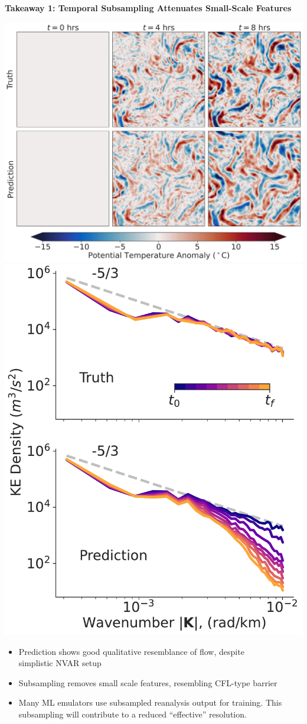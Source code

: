 
\vspace{-1em}
\begin{tcolorbox}[width=\textwidth,
    colframe=sapphire,
    colback=white,
    arc=24pt,
    boxrule=5pt,
    boxsep=0.5em]


    \begin{minipage}{\textwidth}
        \centering
        \textbf{Takeaway 1: Temporal Subsampling Attenuates Small-Scale Features}
    \end{minipage}
    \vspace{1em}

    \begin{minipage}{\textwidth}
        \centering
        \includegraphics[width=.65\textwidth]{../../figures/nvar-diff-4800dt-nice.jpg}
        \includegraphics[width=.34\textwidth,trim={0, -2em, 0, 0}, clip]{
        ../../figures/spectrum_4800dt_nice.pdf}
    \end{minipage}

    \vspace{1.5em}
    \begin{minipage}{\textwidth}
        \begin{itemize}
            \item Prediction shows good qualitative resemblance of flow,
                despite\\simplistic NVAR setup
            \item Subsampling removes small scale features, resembling
                CFL-type barrier
            \item Many ML emulators use subsampled reanalysis output for
                training. This subsampling will contribute to a reduced
                ``effective'' resolution.
        \end{itemize}
    \end{minipage}
\end{tcolorbox}


